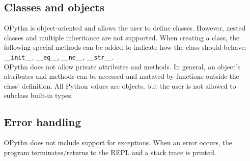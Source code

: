 \documentclass[11pt, twoside]{article}
\newcommand{\ms}{\texttt}
\begin{document}
    \subsection{Classes and objects}
    OPythn is object-oriented and allows the user to define classes. However, nested classes and multiple inheritance are not supported. When creating a class, the following special methods can be added to indicate how the class should behave: \ms{\_\_init\_\_}, \ms{\_\_eq\_\_}, \ms{\_\_ne\_\_}, \ms{\_\_str\_\_}.\\
    OPythn does not allow private attributes and methods. In general, an object's attributes and methods can be accessed and mutated by functions outside the class' definition. All Python values are objects, but the user is not allowed to subclass built-in types.
    \subsection{Error handling}
    OPythn does not include support for exceptions. When an error occurs, the program terminates/returns to the REPL and a stack trace is printed.
\end{document}
